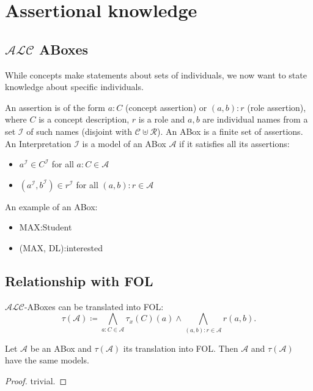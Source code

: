 \section{Assertional knowledge}
\subsection{$\mathcal{ALC}$ ABoxes}
While concepts make statements about sets of individuals, we now want to state knowledge about specific individuals.

\begin{definition}
	An assertion is of the form $a:C$ (concept assertion) or $(a,b):r$ (role assertion),
	where $C$ is a concept description, $r$ is a role and $a,b$ are individual names from a set $\mathscr{I}$ of such names (disjoint with $\mathscr{C} \uplus \mathscr{R}$).
	An ABox is a finite set of assertions.
	An Interpretation $\mathcal{I}$ is a model of an ABox $\mathcal{A}$ if it satisfies all its assertions:
	\begin{itemize}
		\item $a^{\mathcal{I}} \in C^{\mathcal{I}}$ for all $a:C \in \mathcal{A}$ 
		\item $(a^{\mathcal{I}}, b^{\mathcal{I}}) \in r^{\mathcal{I}}$ for all $(a,b):r \in \mathcal{A}$
	\end{itemize}
\end{definition}

\begin{example}
	An example of an ABox:
	\begin{itemize}
		\item MAX:Student
		\item (MAX, DL):interested
	\end{itemize}
\end{example}

\subsection{Relationship with FOL}
$\mathcal{ALC}$-ABoxes can be translated into FOL:
\[
	\tau(\mathcal{A}) \coloneqq \bigwedge_{a:C \in \mathcal{A}} \tau_{x}(C)(a) \land \bigwedge_{(a,b):r \in \mathcal{A}} r(a,b)
.\]

\begin{lemma}
	Let $\mathcal{A}$ be an ABox and $\tau(\mathcal{A})$ its translation into FOL.
	Then $\mathcal{A}$ and $\tau (\mathcal{A})$ have the same models.
\end{lemma}
\begin{proof}
	trivial.
\end{proof}

